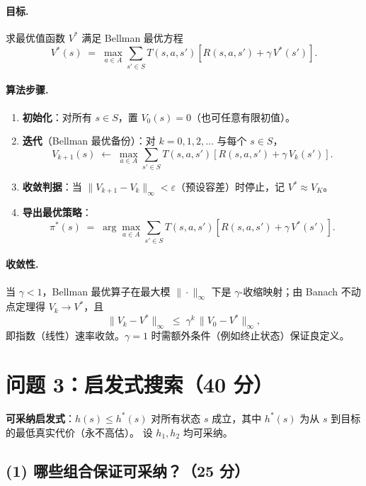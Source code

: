 \documentclass[12pt]{article}
\begin{document}
\paragraph{目标.} 求最优值函数 $V^{*}$ 满足 Bellman 最优方程
\[
V^{*}(s)\;=\;\max_{a\in A}\sum_{s'\in S} T(s,a,s')\!\left[R(s,a,s')+\gamma\,V^{*}(s')\right].
\]

\paragraph{算法步骤.}
\begin{enumerate}
\item \textbf{初始化}：对所有 $s\in S$，置 $V_{0}(s)=0$（也可任意有限初值）。
\item \textbf{迭代}（Bellman 最优备份）：对 $k=0,1,2,\dots$ 与每个 $s\in S$，
\[
V_{k+1}(s)\;\leftarrow\;\max_{a\in A}\sum_{s'\in S} T(s,a,s')\!\left[R(s,a,s')+\gamma\,V_{k}(s')\right].
\]
\item \textbf{收敛判据}：当 $\bigl\|V_{k+1}-V_{k}\bigr\|_{\infty}<\varepsilon$（预设容差）时停止，记 $V^{*}\approx V_{K}$。
\item \textbf{导出最优策略}：
\[
\pi^{*}(s)\;=\;\arg\max_{a\in A}\sum_{s'\in S} T(s,a,s')\!\left[R(s,a,s')+\gamma\,V^{*}(s')\right].
\]
\end{enumerate}

\paragraph{收敛性.}
当 $\gamma<1$，Bellman 最优算子在最大模 $\|\cdot\|_{\infty}$ 下是 $\gamma$-收缩映射；由 Banach 不动点定理得 $V_{k}\to V^{*}$，且
\[
\|V_{k}-V^{*}\|_{\infty}\;\le\;\gamma^{k}\,\|V_{0}-V^{*}\|_{\infty},
\]
即指数（线性）速率收敛。$\gamma=1$ 时需额外条件（例如终止状态）保证良定义。

\newpage
\section*{问题 3：启发式搜索（40 分）}

\textbf{可采纳启发式}：$h(s)\le h^{*}(s)$ 对所有状态 $s$ 成立，其中 $h^{*}(s)$ 为从 $s$ 到目标的最低真实代价（永不高估）。
设 $h_{1},h_{2}$ 均可采纳。

\subsection*{(1) 哪些组合保证可采纳？（25 分）}
\end{document}
